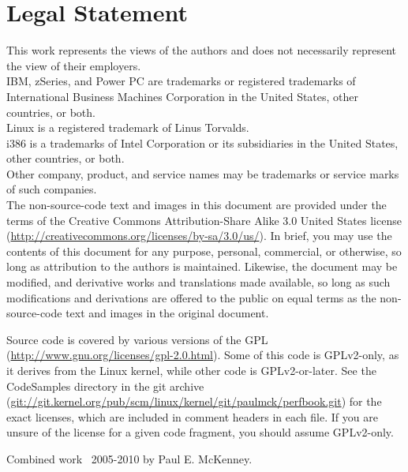 
\section*{Legal Statement}

{ \small
This work represents the views of the authors and does not necessarily
represent the view of their employers.\\
IBM, zSeries, and Power PC are trademarks or registered trademarks of
International Business Machines Corporation in the United States,
other countries, or both.\\
Linux is a registered trademark of Linus Torvalds.\\
i386 is a trademarks of Intel Corporation or its
subsidiaries in the United States, other countries, or both. \\
Other company, product, and service names may be trademarks or service marks
of such companies.\\

The non-source-code text and images in this document are provided under
the terms of the Creative Commons Attribution-Share Alike 3.0 United
States license
(\url{http://creativecommons.org/licenses/by-sa/3.0/us/}).
In brief, you may use the contents of this document for any purpose,
personal, commercial, or otherwise, so long as attribution to the
authors is maintained.  Likewise, the document may be modified,
and derivative works and translations made available, so long as
such modifications and derivations are offered to the public on equal
terms as the non-source-code text and images in the original document.

Source code is covered by various versions of the GPL
(\url{http://www.gnu.org/licenses/gpl-2.0.html}).
Some of this code is GPLv2-only, as it derives from the Linux kernel,
while other code is GPLv2-or-later.
See the CodeSamples directory in the git archive
(\url{git://git.kernel.org/pub/scm/linux/kernel/git/paulmck/perfbook.git})
for the exact licenses, which are included in comment headers in each file.
If you are unsure of the license for a given code fragment,
you should assume GPLv2-only.

Combined work {\textcopyright}~2005-2010 by Paul E. McKenney.
}
